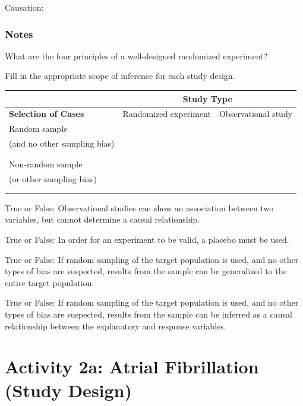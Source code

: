 \documentclass[
]{report}
\newcommand{\rgs}{\vspace{12pt}} %
\begin{document}
Causation:
\rgs

\hypertarget{notes-2}{%
\subsubsection*{Notes}\label{notes-2}}

What are the four principles of a well-designed randomized experiment?\\
\rgs
\rgs
\rgs

Fill in the appropriate scope of inference for each study design.

\begin{center}
\begin{tabular}{|p{2in}|p{2in}|p{2in}|}
\hline
 & \multicolumn{2}{|c|}{\textbf{Study Type}} \\ \hline
 \textbf{Selection of Cases} & Randomized experiment & Observational study \\ \hline
 Random sample && \\ 
 (and no other sampling bias) & & \\ 
  & & \\
   & & \\ \hline
   Non-random sample && \\ 
   (or other sampling bias) & & \\ 
  & & \\
   & & \\ \hline
\end{tabular}
\end{center}

\rgs

True or False: Observational studies can show an association between two variables, but cannot determine a causal relationship.

True or False: In order for an experiment to be valid, a placebo must be used.

True or False: If random sampling of the target population is used, and no other types of bias are suspected, results from the sample can be generalized to the entire target population.

True or False: If random sampling of the target population is used, and no other types of bias are suspected, results from the sample can be inferred as a causal relationship between the explanatory and response variables.

\newpage

\hypertarget{activity-2a-atrial-fibrillation-study-design}{%
\section{Activity 2a: Atrial Fibrillation (Study Design)}\label{activity-2a-atrial-fibrillation-study-design}}
\end{document}
